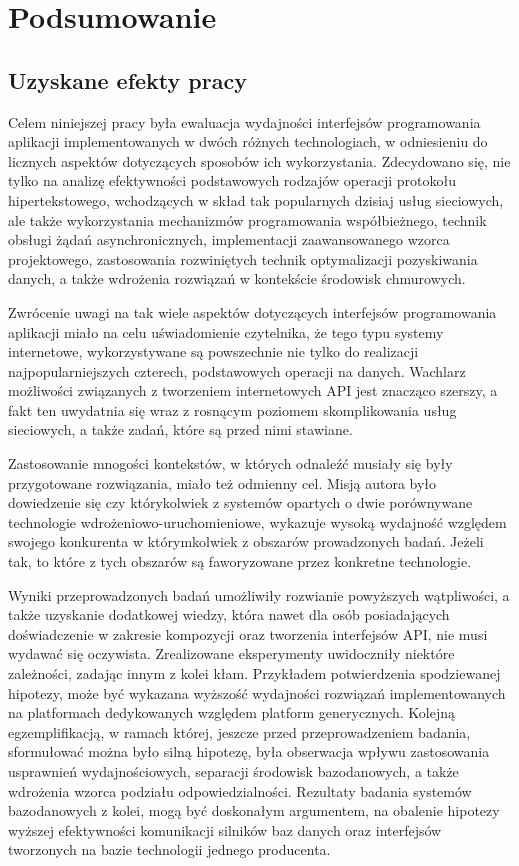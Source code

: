 \chapter{Podsumowanie}
\section{Uzyskane efekty pracy}
Celem niniejszej pracy była ewaluacja wydajności interfejsów programowania aplikacji implementowanych w dwóch różnych technologiach, w odniesieniu do licznych aspektów dotyczących sposobów ich wykorzystania. Zdecydowano się, nie tylko na analizę efektywności podstawowych rodzajów operacji protokołu hipertekstowego, wchodzących w skład tak popularnych dzisiaj usług sieciowych, ale także wykorzystania mechanizmów programowania współbieżnego, technik obsługi żądań asynchronicznych, implementacji zaawansowanego wzorca projektowego, zastosowania rozwiniętych technik optymalizacji pozyskiwania danych, a także wdrożenia rozwiązań w kontekście środowisk chmurowych.

Zwrócenie uwagi na tak wiele aspektów dotyczących interfejsów programowania aplikacji miało na celu uświadomienie czytelnika, że tego typu systemy internetowe, wykorzystywane są powszechnie nie tylko do realizacji najpopularniejszych czterech, podstawowych operacji na danych. Wachlarz możliwości związanych z tworzeniem internetowych API jest znacząco szerszy, a fakt ten uwydatnia się wraz z rosnącym poziomem skomplikowania usług sieciowych, a także zadań, które są przed nimi stawiane.

Zastosowanie mnogości kontekstów, w których odnaleźć musiały się były przygotowane rozwiązania, miało też odmienny cel. Misją autora było dowiedzenie się czy którykolwiek z systemów opartych o dwie porównywane technologie wdrożeniowo-uruchomieniowe, wykazuje wysoką wydajność względem swojego konkurenta w którymkolwiek z obszarów prowadzonych badań. Jeżeli tak, to które z tych obszarów są faworyzowane przez konkretne technologie.

Wyniki przeprowadzonych badań umożliwiły rozwianie powyższych wątpliwości, a także uzyskanie dodatkowej wiedzy, która nawet dla osób posiadających doświadczenie w zakresie kompozycji oraz tworzenia interfejsów API, nie musi wydawać się oczywista. Zrealizowane eksperymenty uwidoczniły niektóre zależności, zadając innym z kolei kłam. Przykładem potwierdzenia spodziewanej hipotezy, może być wykazana wyższość wydajności rozwiązań implementowanych na platformach dedykowanych względem platform generycznych. Kolejną egzemplifikacją, w ramach której, jeszcze przed przeprowadzeniem badania, sformułować można było silną hipotezę, była obserwacja wpływu zastosowania usprawnień wydajnościowych, separacji środowisk bazodanowych, a także wdrożenia wzorca podziału odpowiedzialności. Rezultaty badania systemów bazodanowych z kolei, mogą być doskonałym argumentem, na obalenie hipotezy wyższej efektywności komunikacji silników baz danych oraz interfejsów tworzonych na bazie technologii jednego producenta.

